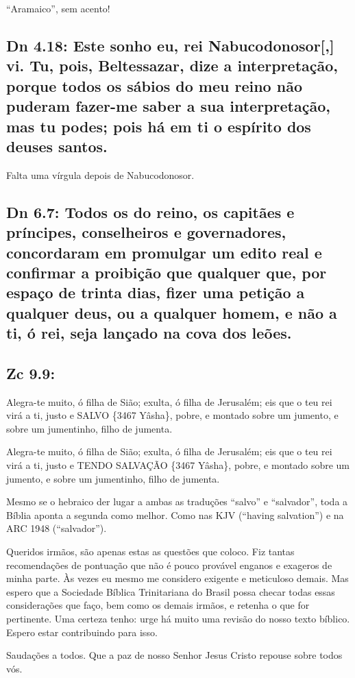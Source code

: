 ``Aramaico'', sem acento!

\subsection{Dn 4.18: Este sonho eu, rei Nabucodonosor[,] vi. Tu, pois, Beltessazar, dize a interpretação, porque todos os sábios do meu reino não puderam fazer-me saber a sua interpretação, mas tu podes; pois há em ti o espírito dos deuses santos.}
Falta uma vírgula depois de Nabucodonosor.

\subsection{Dn 6.7: Todos os  do reino, os capitães e príncipes, conselheiros e governadores, concordaram em promulgar um edito real e confirmar a proibição que qualquer que, por espaço de trinta dias, fizer uma petição a qualquer deus, ou a qualquer homem, e não a ti, ó rei, seja lançado na cova dos leões.}

\subsection{Zc 9.9:}

Alegra-te muito, ó filha de Sião; exulta, ó filha de Jerusalém; eis que o teu rei virá a ti, justo e SALVO \{3467 Yâsha\}, pobre, e montado sobre um jumento, e sobre um jumentinho, filho de jumenta.

Alegra-te muito, ó filha de Sião; exulta, ó filha de Jerusalém; eis que o teu rei virá a ti, justo e TENDO SALVAÇÃO \{3467 Yâsha\}, pobre, e montado sobre um jumento, e sobre um jumentinho, filho de jumenta.

Mesmo se o hebraico der lugar a ambas as traduções ``salvo'' e
``salvador'', toda a Bíblia aponta a segunda como melhor. Como nas KJV
(``having salvation'') e na ARC 1948 (``salvador'').


\vspace{24pt}

Queridos irmãos, são apenas estas as questões que coloco. Fiz tantas
recomendações de pontuação que não é pouco provável enganos e exageros
de minha parte. Às vezes eu mesmo me considero exigente e meticuloso
demais. Mas espero que a Sociedade Bíblica Trinitariana do Brasil
possa checar todas essas considerações que faço, bem como os demais
irmãos, e retenha o que for pertinente.  Uma certeza tenho: urge há
muito uma revisão do nosso texto bíblico.  Espero estar contribuindo
para isso.

\vspace{12pt}

Saudações a todos. Que a paz de nosso Senhor Jesus Cristo repouse
sobre todos vós.

\vspace{24pt}
